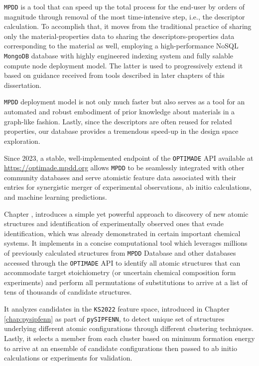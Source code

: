 \texttt{MPDD} is a tool that can speed up the total process for the end-user by orders of magnitude through removal of the most time-intensive step, i.e., the descriptor calculation. To accomplish that, it moves from the traditional practice of sharing only the material-properties data to sharing the descriptors-properties data corresponding to the material as well, employing a high-performance NoSQL \texttt{MongoDB} database with highly engineered indexing system and fully salable compute node deployment model. The latter is used to progressively extend it based on guidance received from tools described in later chapters of this dissertation.

\texttt{MPDD} deployment model is not only much faster but also serves as a tool for an automated and robust embodiment of prior knowledge about materials in a graph-like fashion. Lastly, since the descriptors are often reused for related properties, our database provides a tremendous speed-up in the design space exploration.

Since 2023, a stable, well-implemented endpoint of the \texttt{OPTIMADE} API available at \href{https://optimade.mpdd.org}{https://optimade.mpdd.org} allows \texttt{MPDD} to be seamlessly integrated with other community databases and serve atomistic feature data associated with their entries for synergistic merger of experimental observations, ab initio calculations, and machine learning predictions.


Chapter , introduces a simple yet powerful approach to discovery of new atomic structures and identification of experimentally observed ones that evade identification, which was already demonstrated in certain important chemical systems. It implements in a concise computational tool which leverages millions of previously calculated structures from \texttt{MPDD} Database and other databases accessed through the \texttt{OPTIMADE} API to identify all atomic structures that can accommodate target stoichiometry (or uncertain chemical composition form experiments) and perform all permutations of substitutions to arrive at a list of tens of thousands of candidate structures. 

It analyzes candidates in the \texttt{KS2022} feature space, introduced in Chapter \ref{chap:pysipfenn} as part of \texttt{pySIPFENN}, to detect unique set of structures underlying different atomic configurations through different clustering techniques. Lastly, it selects a member from each cluster based on minimum formation energy to arrive at an ensemble of candidate configurations then passed to ab initio calculations or experiments for validation. 

